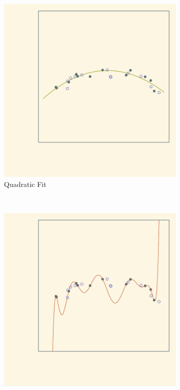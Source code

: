 \begin{figure}[t!]
\begin{subfigure}[t]{0.33\textwidth}
        \includegraphics[width=\textwidth]{fig/test_quadratic}
        \caption{Quadratic Fit \label{fig:poly-quad}}
    \end{subfigure}%
    ~
    \begin{subfigure}[t]{0.33\textwidth}
        \centering
        \includegraphics[width=\textwidth]{fig/test_overfit}

\end{subfigure}
\end{figure}
